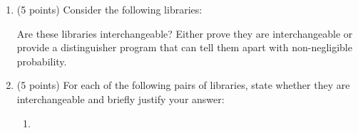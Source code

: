 \documentclass[10pt,a4paper,american]{article}
\begin{document}
\begin{enumerate}
	\item (5 points) Consider the following libraries:
	      \begin{center}
	      \end{center}
	      Are these libraries interchangeable? Either prove they are interchangeable or provide a distinguisher program that can tell them apart with non-negligible probability.

	\item (5 points) For each of the following pairs of libraries, state whether they are interchangeable and briefly justify your answer:
	      \begin{enumerate}
		      \item
		            \begin{center}
		            \end{center}


\end{enumerate}
\end{enumerate}
\end{document}
